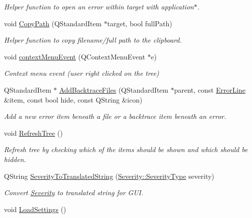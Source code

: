 \begin{DoxyCompactItemize}
\begin{DoxyCompactList}\small\item\em Helper function to open an error within target with application$\ast$. \end{DoxyCompactList}\item 
void \hyperlink{class_results_tree_af1612a3ae87e0bd9ac2320eb11cdd891}{Copy\-Path} (Q\-Standard\-Item $\ast$target, bool full\-Path)
\begin{DoxyCompactList}\small\item\em Helper function to copy filename/full path to the clipboard. \end{DoxyCompactList}\item 
void \hyperlink{class_results_tree_a0f858d208a0440a6a2a98256cbb77ba8}{context\-Menu\-Event} (Q\-Context\-Menu\-Event $\ast$e)
\begin{DoxyCompactList}\small\item\em Context menu event (user right clicked on the tree) \end{DoxyCompactList}\item 
Q\-Standard\-Item $\ast$ \hyperlink{class_results_tree_a73c70aff7a2fdaba4ab01806030a679d}{Add\-Backtrace\-Files} (Q\-Standard\-Item $\ast$parent, const \hyperlink{class_error_line}{Error\-Line} \&item, const bool hide, const Q\-String \&icon)
\begin{DoxyCompactList}\small\item\em Add a new error item beneath a file or a backtrace item beneath an error. \end{DoxyCompactList}\item 
void \hyperlink{class_results_tree_aba23d67996a5c56474d610f84a1bbd2b}{Refresh\-Tree} ()
\begin{DoxyCompactList}\small\item\em Refresh tree by checking which of the items should be shown and which should be hidden. \end{DoxyCompactList}\item 
Q\-String \hyperlink{class_results_tree_ac2a9b0751652e3e5e7cbed428b0af32e}{Severity\-To\-Translated\-String} (\hyperlink{class_severity_ac185938ae084355bbf1790cf1a70caa6}{Severity\-::\-Severity\-Type} severity)
\begin{DoxyCompactList}\small\item\em Convert \hyperlink{class_severity}{Severity} to translated string for G\-U\-I. \end{DoxyCompactList}\item 
void \hyperlink{class_results_tree_af015f1d1b36f1979d106055f05bb9abb}{Load\-Settings} ()

\end{DoxyCompactItemize}
